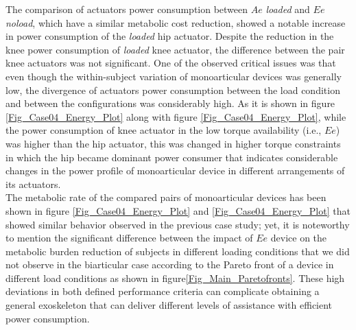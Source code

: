 \documentclass[10pt,letterpaper]{article}
\begin{document}
The comparison of actuators power consumption between $Ae$ {\it loaded} and $Ee$ {\it noload}, which have a similar metabolic cost reduction, showed a notable increase in power consumption of the {\it loaded} hip actuator. Despite the reduction in the knee power consumption of {\it loaded} knee actuator, the difference between the pair knee actuators was not significant. One of the observed critical issues was that even though the within-subject variation of monoarticular devices was generally low, the divergence of actuators power consumption between the load condition and between the configurations was considerably high. As it is shown in figure \ref{Fig_Case04_Energy_Plot} along with figure \ref{Fig_Case04_Energy_Plot}, while the power consumption of knee actuator in the low torque availability (i.e., $Ee$) was higher than the hip actuator, this was changed in higher torque constraints in which the hip became dominant power consumer that indicates considerable changes in the power profile of monoarticular device in different arrangements of its actuators.\\
The metabolic rate of the compared pairs of monoarticular devices has been shown in figure \ref{Fig_Case04_Energy_Plot} and \ref{Fig_Case04_Energy_Plot} that showed similar behavior observed in the previous case study; yet, it is noteworthy to mention the significant difference between the impact of $Ee$ device on the metabolic burden reduction of subjects in different loading conditions that we did not observe in the biarticular case according to the Pareto front of a device in different load conditions as shown in figure\ref{Fig_Main_Paretofronts}. These high deviations in both defined performance criteria can complicate obtaining a general exoskeleton that can deliver different levels of assistance with efficient power consumption.\\
\end{document}
